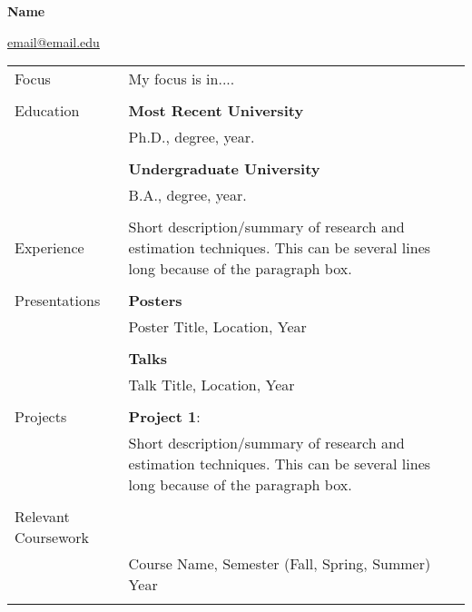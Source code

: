 \noindent  \LARGE{\textbf{Name}}

\normalsize
\noindent \href{mailto:email@email.com}{email@email.edu}

\noindent\hrulefill
\vspace{1em}

\noindent \begin{tabular}{@{} l l}
 \Large{Focus} & My focus is in....\\
     & \\
 \Large{Education}    & \textbf{Most Recent University} \\
     & Ph.D., degree, year. \\
     & \\
     & \textbf{Undergraduate University} \\
     & B.A., degree, year. \\
     & \\
 \Large{Experience}    & {\parbox{4.3in}{ \vspace{1.2em} Short description/summary of research and estimation techniques. This can be several lines long because of the paragraph box.}}\\
    & \\
  \Large{Presentations}   & \textbf{Posters} \\
     & Poster Title, Location, Year\\
     & \\
     &\textbf{Talks} \\
     & Talk Title, Location, Year\\
     & \\
  \Large{Projects}   & \textbf{Project 1}: \\
     & {\parbox{4.3in}{Short description/summary of research and estimation techniques. This can be several lines long because of the paragraph box.}}\\
     & \\
  \Large{Relevant Coursework }    & \\
     & Course Name, Semester (Fall, Spring, Summer) Year \\
     & \\

\end{tabular}

